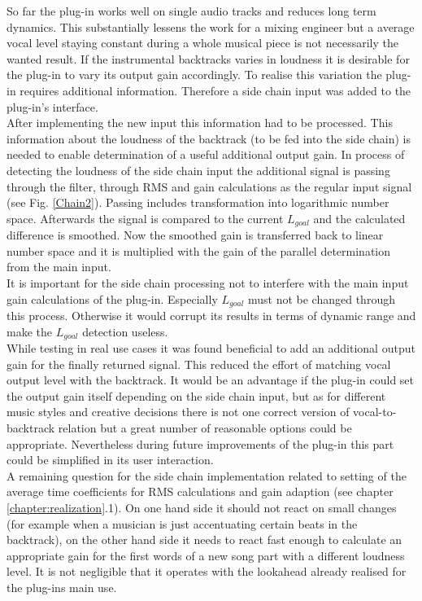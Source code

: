 So far the plug-in works well on single audio tracks and reduces long term dynamics. This substantially lessens the work for a mixing engineer but a average vocal level staying constant during a whole musical piece is not necessarily the wanted result. If the instrumental backtracks varies in loudness it is desirable for the plug-in to vary its output gain accordingly. To realise this variation the plug-in requires additional information. Therefore a side chain input was added to the plug-in's interface.\\
After implementing the new input this information had to be processed. This information about the loudness of the backtrack (to be fed into the side chain) is needed to enable determination of a useful additional output gain. In process of detecting the loudness of the side chain input the additional signal is passing through the filter, through RMS and gain calculations as the regular input signal (see Fig. \ref{Chain2}). Passing includes transformation into logarithmic number space. Afterwards the signal is compared to the current $L_{goal}$ and the calculated difference is smoothed. Now the smoothed gain is transferred back to linear number space and it is multiplied with the gain of the parallel determination from the main input.\\
It is important for the side chain processing not to interfere with the main input gain calculations of the plug-in. Especially $L_{goal}$ must not be changed through this process. Otherwise it would corrupt its results in terms of dynamic range and make the $L_{goal}$ detection useless.\\
While testing in real use cases it was found beneficial to add an additional output gain for the finally returned signal. This reduced the effort of matching vocal output level with the backtrack. It would be an advantage if the plug-in could set the output gain itself depending on the side chain input, but as for different music styles and creative decisions there is not one correct version of vocal-to-backtrack relation but a great number of reasonable options could be appropriate. Nevertheless during future improvements of the plug-in this part could be simplified in its user interaction.\\
A remaining question for the side chain implementation related to setting of the average time coefficients for RMS calculations and gain adaption (see chapter \ref{chapter:realization}.1). On one hand side it should not react on small changes (for example when a musician is just accentuating certain beats in the backtrack), on the other hand side it needs to react fast enough to calculate an appropriate gain for the first words of a new song part with a different loudness level. It is not negligible that it operates with the lookahead already realised for the plug-ins main use.\\
